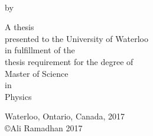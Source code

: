 \begin{titlepage}
    \begin{center}
      
      \hfill
      
      \vfill
      
      \begingroup
      \color{Maroon}{\Large \spacedallcaps{\myTitle}} \\ \bigskip
      \endgroup
      
      by \\ \bigskip
      
      \myName
      
      \vfill
      
      A thesis \\
      presented to the University of Waterloo \\
      in fulfillment of the \\
      thesis requirement for the degree of \\
      Master of Science \\
      in \\
      Physics
      
      \vfill
      
      Waterloo, Ontario, Canada, 2017 \\
      \vspace{1 em}
      \copyright Ali Ramadhan 2017
      
      \vfill
      
    \end{center}
\end{titlepage}  

